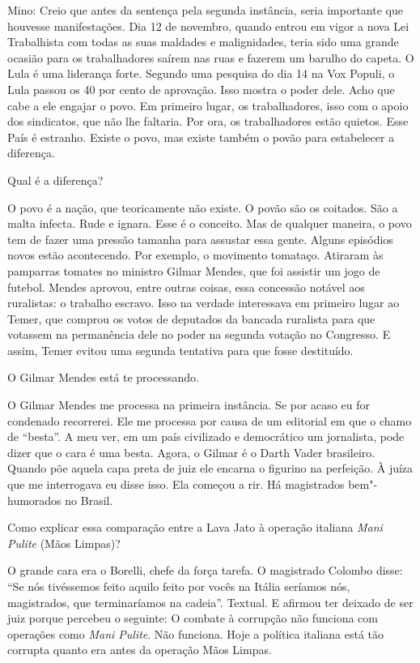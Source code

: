Mino: Creio que antes da sentença pela segunda instância, seria
importante que houvesse manifestações. Dia 12 de novembro, quando entrou
em vigor a nova Lei Trabalhista com todas as suas maldades e
malignidades, teria sido uma grande ocasião para os trabalhadores saírem
nas ruas e fazerem um barulho do capeta. O Lula é uma liderança forte.
Segundo uma pesquisa do dia 14 na Vox Populi, o Lula passou os 40 por
cento de aprovação. Isso mostra o poder dele. Acho que cabe a ele
engajar o povo. Em primeiro lugar, os trabalhadores, isso com o apoio
dos sindicatos, que não lhe faltaria. Por ora, os trabalhadores estão
quietos. Esse País é estranho. Existe o povo, mas existe também o povão
para estabelecer a diferença.

\falaG Qual é a diferença?

\falaM O povo é a nação, que teoricamente não existe. O povão são os
coitados. São a malta infecta. Rude e ignara. Esse é o conceito. Mas de
qualquer maneira, o povo tem de fazer uma pressão tamanha para assustar
essa gente. Alguns episódios novos estão acontecendo. Por exemplo, o
movimento tomataço. Atiraram às pamparras tomates no ministro Gilmar
Mendes, que foi assistir um jogo de futebol. Mendes aprovou, entre
outras coisas, essa concessão notável aos ruralistas: o trabalho
escravo. Isso na verdade interessava em primeiro lugar ao Temer, que
comprou os votos de deputados da bancada ruralista para que votassem na
permanência dele no poder na segunda votação no Congresso. E assim,
Temer evitou uma segunda tentativa para que fosse destituído.

\falaG O Gilmar Mendes está te processando.

\falaM O Gilmar Mendes me processa na primeira instância. Se por acaso eu
for condenado recorrerei. Ele me processa por causa de um editorial em
que o chamo de ``besta''. A meu ver, em um país civilizado e democrático
um jornalista, pode dizer que o cara é uma besta. Agora, o Gilmar é o
Darth Vader brasileiro. Quando põe aquela capa preta de juiz ele encarna
o figurino na perfeição. À juíza que me interrogava eu disse isso. Ela
começou a rir. Há magistrados bem"-humorados no Brasil.

\falaG Como explicar essa comparação entre a Lava Jato à operação italiana
\emph{Mani Pulite} (Mãos Limpas)?

\falaM O grande cara era o Borelli, chefe da força tarefa. O magistrado
Colombo disse: ``Se nós tivéssemos feito aquilo feito por vocês na
Itália seríamos nós, magistrados, que terminaríamos na cadeia''.
Textual. E afirmou ter deixado de ser juiz porque percebeu o seguinte: O
combate à corrupção não funciona com operações como \emph{Mani Pulite}.
Não funciona. Hoje a política italiana está tão corrupta quanto era
antes da operação Mãos Limpas.

